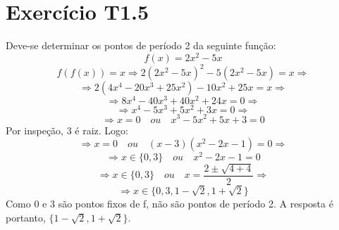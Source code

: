 \documentclass{article}[twocolumn]
\begin{document}
	\section{Exercício T1.5}
	Deve-se determinar os pontos de período 2 da seguinte função:
	\begin{equation}
		f(x) = 2x^{2} - 5x
	\end{equation}
	\begin{equation}
		f(f(x)) = x \Rightarrow 2(2x^{2} - 5x)^{2} - 5(2x^{2} - 5x) = x \Rightarrow
	\end{equation}
	\begin{equation}
		\Rightarrow 2(4x^{4} - 20x^{3} + 25x^{2}) - 10x^{2} + 25x = x \Rightarrow
	\end{equation}
	\begin{equation}
		\Rightarrow 8x^{4} - 40x^{3} + 40x^{2} + 24x = 0 \Rightarrow
	\end{equation}
	\begin{equation}
		\Rightarrow x^{4} - 5x^{3} + 5x^{2} + 3x = 0 \Rightarrow
	\end{equation}
	\begin{equation}
		\Rightarrow x = 0 \quad ou \quad x^{3} - 5x^{2} + 5x + 3 = 0
	\end{equation}
	Por inspeção, 3 é raiz. Logo:
	\begin{equation}
		\Rightarrow x = 0 \quad ou \quad (x - 3)(x^{2} - 2x - 1) = 0 \Rightarrow
	\end{equation}
	\begin{equation}
		\Rightarrow x \in \{0, 3\} \quad ou \quad x^{2} - 2x - 1 = 0
	\end{equation}
	\begin{equation}
		\Rightarrow x \in \{0, 3\} \quad ou \quad x = \frac{2 \pm \sqrt{4 + 4}}{2} \Rightarrow
	\end{equation}
	\begin{equation}
		\Rightarrow x \in \{0, 3, 1 - \sqrt{2}, 1 + \sqrt{2}\}
	\end{equation}
	Como 0 e 3 são pontos fixos de f, não são pontos de período 2. A resposta é portanto,
	$\{1 - \sqrt{2}, 1 + \sqrt{2}\}$.
\end{document}
